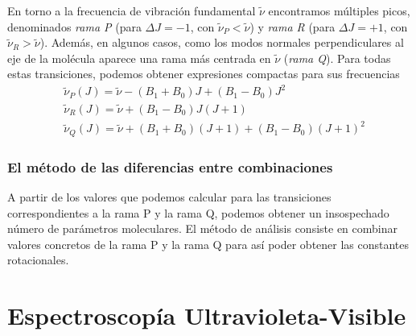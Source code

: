 \documentclass{tufte-book}
\begin{document}
En torno a la frecuencia de vibración fundamental $\tilde{\nu}$
encontramos múltiples picos, denominados \textit{rama P} (para 
$\Delta J=-1$, con $\tilde{\nu}_P<\tilde{\nu}$) y \textit{rama R}
(para $\Delta J=+1$, con $\tilde{\nu}_R>\tilde{\nu}$). Además, en 
algunos casos, como los modos normales perpendiculares al eje de
la molécula aparece una rama más centrada en $\tilde{\nu}$ 
(\textit{rama Q}). Para todas estas transiciones, podemos obtener
expresiones compactas para sus frecuencias
\begin{align}
    &\tilde{\nu}_P(J)=\tilde{\nu} - (B_1+B_0)J + (B_1-B_0)J^2\\
    &\tilde{\nu}_R(J)=\tilde{\nu} + (B_1-B_0)J(J+1)\\
    &\tilde{\nu}_Q(J)=\tilde{\nu} + (B_1+B_0)(J+1) + (B_1-B_0)(J+1)^2 
\end{align}

\subsection{El método de las diferencias entre combinaciones}
A partir de los valores que podemos calcular para las transiciones
correspondientes a la rama P y la rama Q, podemos obtener un 
insospechado número de parámetros moleculares. El método de 
análisis consiste en combinar valores concretos de la rama P y la
rama Q para así poder obtener las constantes rotacionales.

\chapter[UV-visible]{Espectroscopía Ultravioleta-Visible}



%
%
\end{document}
